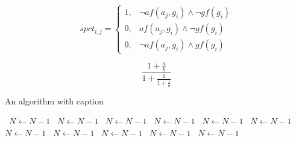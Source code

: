 \documentclass[a4paper]{article}
\begin{document}
\begin{equation}
spct_{i,j} =
\begin{cases}
1, & \text{$\neg af(a_j,g_i) \wedge \neg gf(g_i)$}\\
0, & \text{$af(a_j,g_i) \wedge \neg gf(g_i)$}\\
0, & \text{$\neg af(a_j,g_i) \wedge gf(g_i)$}
\end{cases}
\end{equation}

\[ \frac{1+\frac{a}{b}}{1+\frac{1}{1+\frac{1}{a}}} \]

\begin{algorithm}
\caption{An algorithm with caption}
\begin{algorithmic}
\    \State $N \gets N - 1$
\    \State $N \gets N - 1$
\    \State $N \gets N - 1$
\    \State $N \gets N - 1$
\    \State $N \gets N - 1$
\    \State $N \gets N - 1$
\    \State $N \gets N - 1$
\    \State $N \gets N - 1$
\    \State $N \gets N - 1$
\    \State $N \gets N - 1$
\    \State $N \gets N - 1$
\EndWhile
\end{algorithmic}
\end{algorithm}
\end{document}
